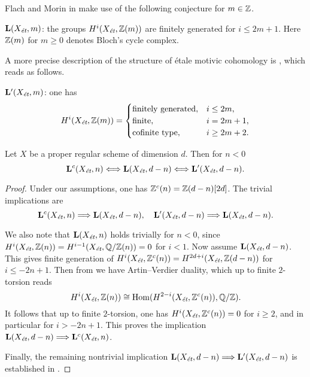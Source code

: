 \documentclass{article}
\numberwithin{equation}{section}
\begin{document}
Flach and Morin in \cite{Flach-Morin-2018} make use of the following conjecture
for $m \in \ZZ$.

\begin{conjecture}
  $\mathbf{L} (X_\et, m)$: the groups $H^i (X_\et, \ZZ (m))$ are finitely
  generated for $i \le 2m+1$. Here $\ZZ (m)$ for $m \ge 0$ denotes Bloch's cycle
  complex.
\end{conjecture}

A more precise description of the structure of étale motivic cohomology is
\cite[Conjecture~4.12]{Geisser-2017}, which reads as follows.

\begin{conjecture}
  $\mathbf{L}' (X_\et, m)$: one has
  \[ H^i (X_\et, \ZZ (m)) = \begin{cases}
      \text{finitely generated}, & i \le 2m, \\
      \text{finite}, & i = 2m + 1, \\
      \text{cofinite type}, & i \ge 2m + 2.
    \end{cases} \]
\end{conjecture}

\begin{proposition}
  \label{prop:Lc-Xet-n-vs-L-Xet-d-n}
  Let $X$ be a proper regular scheme of dimension $d$. Then for $n < 0$
  \[ \mathbf{L}^c (X_\et, n) \Longleftrightarrow
    \mathbf{L} (X_\et, d-n) \Longleftrightarrow
    \mathbf{L}' (X_\et, d-n). \]

  \begin{proof}
    Under our assumptions, one has $\ZZ^c (n) = \ZZ (d-n) [2d]$. The trivial
    implications are
    \[ \mathbf{L}^c (X_\et, n) \Longrightarrow \mathbf{L} (X_\et, d-n), \quad
      \mathbf{L}' (X_\et, d-n) \Longrightarrow \mathbf{L} (X_\et, d-n). \]

    We also note that $\mathbf{L} (X_\et, n)$ holds trivially for $n < 0$, since
    $H^i (X_\et, \ZZ (n)) = H^{i-1} (X_\et, \QQ/\ZZ (n)) = 0$ for $i < 1$.
    Now assume $\mathbf{L} (X_\et, d-n)$. This gives finite generation of
    $H^i (X_\et, \ZZ^c (n)) = H^{2d+i} (X_\et, \ZZ (d-n))$ for $i \le -2n + 1$.
    Then from \cite[Proposition~3.4]{Flach-Morin-2018} we have Artin--Verdier
    duality, which up to finite $2$-torsion reads
    $$H^i (X_\et, \ZZ (n)) \cong \Hom (H^{2-i} (X_\et, \ZZ^c (n)), \QQ/\ZZ).$$
    It follows that up to finite $2$-torsion, one has
    $H^i (X_\et, \ZZ^c (n)) = 0$ for $i \ge 2$, and in particular for
    $i > -2n + 1$. This proves the implication
    $\mathbf{L} (X_\et, d-n) \Longrightarrow \mathbf{L}^c (X_\et, n)$.

    Finally, the remaining nontrivial implication
    $\mathbf{L} (X_\et, d-n) \Longrightarrow \mathbf{L}' (X_\et, d-n)$ is
    established in \cite[Proposition~3.4]{Flach-Morin-2018}.
  \end{proof}
\end{proposition}
\end{document}
